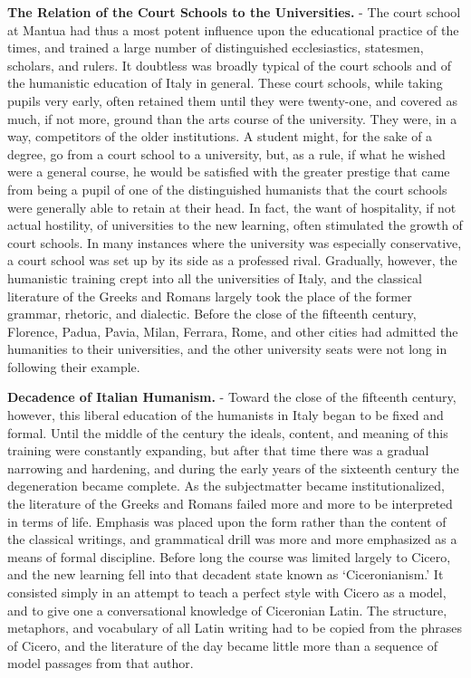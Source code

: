 \documentclass[]{book}
\begin{document}
\textbf{The Relation of the Court Schools to the Universities.} - The court school at Mantua had thus a most potent influence upon the educational practice of the times, and trained a large number of distinguished ecclesiastics, statesmen, scholars, and rulers. It doubtless was broadly typical of the court schools and of the humanistic education of Italy in general. These court schools, while taking pupils very early, often retained them until they were twenty-one, and covered as much, if not more, ground than the arts course of the university. They were, in a way, competitors of the older institutions. A student might, for the sake of a degree, go from a court school to a university, but, as a rule, if what he wished were a general course, he would be satisfied with the greater prestige that came from being a pupil of one of the distinguished humanists that the court schools were generally able to retain at their head. In fact, the want of hospitality, if not actual hostility, of universities to the new learning, often stimulated the growth of court schools. In many instances where the university was especially conservative, a court school was set up by its side as a professed rival. Gradually, however, the humanistic training crept into all the universities of Italy, and the classical literature of the Greeks and Romans largely took the place of the former grammar, rhetoric, and dialectic. Before the close of the fifteenth century, Florence, Padua, Pavia, Milan, Ferrara, Rome, and other cities had admitted the humanities to their universities, and the other university seats were not long in following their example.

\textbf{Decadence of Italian Humanism.} - Toward the close of the fifteenth century, however, this liberal education of the humanists in Italy began to be fixed and formal. Until the middle of the century the ideals, content, and meaning of this training were constantly expanding, but after that time there was a gradual narrowing and hardening, and during the early years of the sixteenth century the degeneration became complete. As the subjectmatter became institutionalized, the literature of the Greeks and Romans failed more and more to be interpreted in terms of life. Emphasis was placed upon the form rather than the content of the classical writings, and grammatical drill was more and more emphasized as a means of formal discipline. Before long the course was limited largely to Cicero, and the new learning fell into that decadent state known as `Ciceronianism.' It consisted simply in an attempt to teach a perfect style with Cicero as a model, and to give one a conversational knowledge of Ciceronian Latin. The structure, metaphors, and vocabulary of all Latin writing had to be copied from the phrases of Cicero, and the literature of the day became little more than a sequence of model passages from that author.
\end{document}
